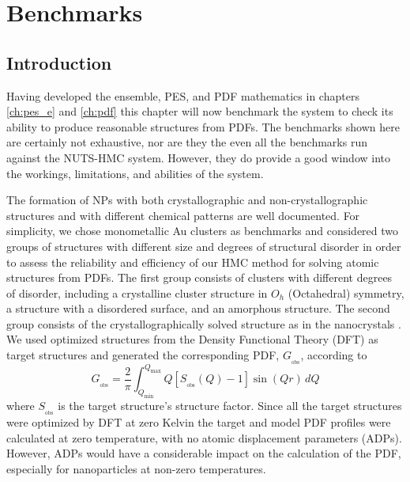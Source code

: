 \graphicspath{{./bmk/figures/}}
\chapter{Benchmarks} \label{ch:bmk}
\section{Introduction}
Having developed the ensemble, PES, and PDF mathematics in chapters \ref{ch:pes_e} and \ref{ch:pdf} this chapter will now benchmark the system to check its ability to produce reasonable structures from PDFs.
The benchmarks shown here are certainly not exhaustive, nor are they the even all the benchmarks run against the NUTS-HMC system.
However, they do provide a good window into the workings, limitations, and abilities of the system.

The formation of NPs with both crystallographic and non-crystallographic structures \cite{Marks1994} and with different chemical patterns \cite{Ferrando2008} are well documented.
For simplicity, we chose monometallic Au clusters as benchmarks and considered two groups of structures with different size and degrees of structural disorder in order to assess the reliability and efficiency of our HMC method for solving atomic structures from PDFs.
The first group consists of  clusters with different degrees of disorder, including a crystalline cluster structure in $O_h$ (Octahedral) symmetry, a structure with a disordered surface, and an amorphous structure.
The second group consists of the crystallographically solved  structure as in the  nanocrystals \cite{Jadzinsky2007,Li2008}.
We used optimized structures from the Density Functional Theory (DFT) as target structures and generated the corresponding PDF, $G_{_\mathrm{obs}}$, according to
\begin{equation}\label{Eq:Gdef}
  G_{_\mathrm{obs}} = \frac{2}{\pi} \int_{Q_\mathrm{min}}^{Q_\mathrm{max}} Q[S_{_\mathrm{obs}}(Q) - 1] \sin{\left (Q r \right )}\, dQ
\end{equation}
where $S_{_\mathrm{obs}}$ is the target structure's structure factor.
Since all the target structures were optimized by DFT at zero Kelvin the target and model PDF profiles were calculated at zero temperature, with no atomic displacement parameters (ADPs).
However, ADPs would have a considerable impact on the calculation of the PDF, especially for nanoparticles at non-zero temperatures.

